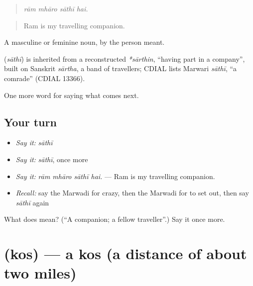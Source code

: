 \begin{quote}
   
\end{quote}

\begin{quote}
\emph{rām mhāro sāthī hai.}
\end{quote}

\begin{quote}
Ram is my travelling companion.
\end{quote}

A masculine or feminine noun, by the person meant.

\begin{cousinweb}
\textbf{} (\emph{sāthī}) is inherited from a reconstructed \emph{*sārthin}, \textquotedblleft{}having part in a company\textquotedblright{}, built on Sanskrit \emph{sārtha}, a band of travellers; CDIAL lists Marwari \emph{sāthī}, \textquotedblleft{}a comrade\textquotedblright{} (CDIAL 13366).
\end{cousinweb}

\begin{grammarlens}[title={What you've built}]
One more word for saying what comes next.
\end{grammarlens}

\subsection*{Your turn}
\begin{itemize}
\raggedright
  \item \emph{Say it:} \emph{sāthī}
  \item \emph{Say it:} \emph{sāthī}, once more
  \item \emph{Say it:} \emph{rām mhāro sāthī hai.} — Ram is my travelling companion.
  \item \emph{Recall:} say the Marwadi for crazy, then the Marwadi for to set out, then say \emph{sāthī} again
\end{itemize}

\begin{tcolorbox}[breakable,colback=teal!4,colframe=teal!35!black,title={Before you move on}]
What does  mean? (\textquotedblleft{}A companion; a fellow traveller\textquotedblright{}.) Say it once more.
\end{tcolorbox}
\section[\texorpdfstring{\mw{कोस} (kos)}{कोस (kos)}]{ (kos) — a kos (a distance of about two miles)}

